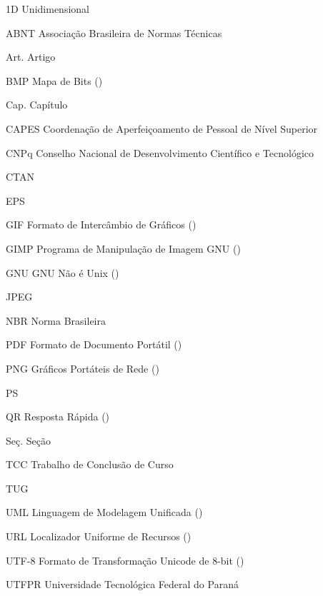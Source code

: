 \begin{AcronymsList}%
\item[1D] Unidimensional
\item[ABNT] Associação Brasileira de Normas Técnicas
\item[Art.] Artigo
\item[BMP] Mapa de Bits ()
\item[Cap.] Capítulo
\item[CAPES] Coordenação de Aperfeiçoamento de Pessoal de Nível Superior
\item[CNPq] Conselho Nacional de Desenvolvimento Científico e Tecnológico
\item[CTAN] 
\item[EPS] 
\item[GIF] Formato de Intercâmbio de Gráficos ()
\item[GIMP] Programa de Manipulação de Imagem GNU ()
\item[GNU] GNU Não é Unix ()
\item[JPEG] 
\item[NBR] Norma Brasileira
\item[PDF] Formato de Documento Portátil ()
\item[PNG] Gráficos Portáteis de Rede ()
\item[PS] 
\item[QR] Resposta Rápida ()
\item[Seç.] Seção
\item[TCC] Trabalho de Conclusão de Curso
\item[TUG] 
\item[UML] Linguagem de Modelagem Unificada ()
\item[URL] Localizador Uniforme de Recursos ()
\item[UTF-8] Formato de Transformação Unicode de 8-bit ()
\item[UTFPR] Universidade Tecnológica Federal do Paraná
\end{AcronymsList}

